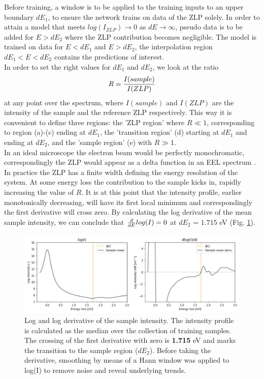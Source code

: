 \documentclass[11pt,a4paper]{article}
\def\frac#1#2{{{#1}\over {#2}}}
\numberwithin{equation}{section}
\numberwithin{figure}{section}
\numberwithin{table}{section}
\begin{document}
Before training, a window is to be applied to the training inputs to an upper boundary $dE_1$, to ensure the network trains on data of the ZLP solely. In order to attain a model that meets $log(I_{ZLP}) \rightarrow 0$ as $dE \rightarrow \infty$, pseudo data is to be added for $E>dE_2$ where the ZLP contribution becomes negligible. The model is trained on data for $E<dE_1$ and $E>dE_2$, the interpolation region $dE_1 < E < dE_2$ contains the predictions of interest. \\

In order to set the right values for $dE_1$ and $dE_2$, we look at the ratio 
\begin{equation}
    R = \frac{I(sample)}{I(ZLP)}
\end{equation}
at any point over the spectrum, where $I(sample)$ and $I(ZLP)$ are the intensity of the sample and the reference ZLP respectively. This way it is convenient to define three regions: the 'ZLP region' where $R\ll1$, corresponding to region (a)-(c) ending at $dE_1$, the 'transition region' (d) starting at $dE_1$ and ending at $dE_2$, and the 'sample region' (e) with $R\gg1$.\\

In an ideal microscope the electron beam would be perfectly monochromatic, correspondingly the ZLP would appear as a delta function in an EEL spectrum \cite{rafferty}. In practice the ZLP has a finite width defining the energy resolution of the system. At some energy loss the contribution to the sample kicks in, rapidly increasing the value of $R$. It is at this point that the intensity profile, earlier monotonically decreasing, will have its first local minimum and correspondingly the first derivative will cross zero. By calculating the log derivative of the mean sample intensity, we can conclude that  $\frac{d}{dE}log(I)=0$ at $dE_2$ = $1.715$ eV  (Fig. \ref{bound}). 

\begin{figure}[H]
    \centering 
    \includegraphics[width=150mm]{plots/bound.png}
    \caption{Log and log derivative of the sample intensity. The intensity profile is calculated as the median over the collection of training samples. The crossing of the first derivative with zero is \textbf{1.715} eV and marks the transition to the sample region ($dE_2$). Before taking the derivative, smoothing by means of a Hann window \cite{hann} was applied to log(I) to remove noise and reveal underlying trends. }
    \label{bound}
\end{figure}
\end{document}
